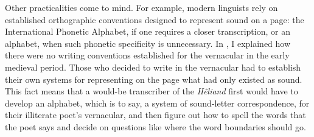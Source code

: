 Other practicalities come to mind. For example, modern linguists rely on established orthographic conventions designed to represent sound on a page: the International Phonetic Alphabet, if one requires a closer transcription, or an alphabet, when such phonetic specificity is unnecessary. In , I explained how there were no writing conventions established for the vernacular in the early medieval period. Those who decided to write in the vernacular had to establish their own systems for representing on the page what had only existed as sound. This fact means that a would-be transcriber of the \textit{Hêliand} first would have to develop an alphabet, which is to say, a system of sound-letter correspondence, for their illiterate poet’s vernacular, and then figure out how to spell the words that the poet says and decide on questions like where the word boundaries should go.

